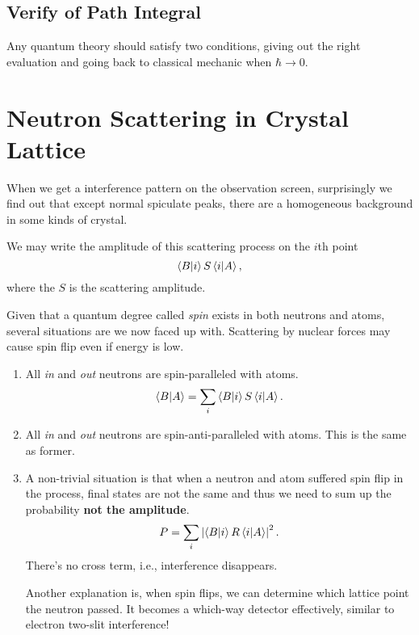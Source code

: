 \subsection[路径积分的检验]{Verify of Path Integral}
Any quantum theory should satisfy two conditions, giving out the right evaluation and going back to classical mechanic when $\hbar \to 0$.

\section[中子的晶格散射]{Neutron Scattering in Crystal Lattice}
When we get a interference pattern on the observation screen, surprisingly we find out that except normal spiculate peaks, there are a homogeneous background in some kinds of crystal.

We may write the amplitude of this scattering process on the $i$th point
\begin{equation}
  \bra{B}\ket{i}S\bra{i}\ket{A},
\end{equation}
where the $S$ is the scattering amplitude.

Given that a quantum degree called \textit{spin} exists in both neutrons and atoms, several situations are we now faced up with. Scattering by nuclear forces may cause spin flip even if energy is low. 

\begin{enumerate}
    \item All \textit{in} and \textit{out} neutrons are spin-paralleled with atoms.
    \begin{equation}
      \bra{B}\ket{A} = \sum_i \bra{B}\ket{i}S\bra{i}\ket{A}.
    \end{equation}
    
    \item All \textit{in} and \textit{out} neutrons are spin-anti-paralleled with atoms. This is the same as former.
    
    \item A non-trivial situation is that when a neutron and atom suffered spin flip in the process, final states are not the same and thus we need to sum up the probability \textbf{not the amplitude}.
    \begin{equation}
      P = \sum_{i} \left| \bra{B}\ket{i} R \bra{i} \ket{A} \right| ^2.
    \end{equation}
    There's no cross term, i.e., interference disappears.

    Another explanation is, when spin flips, we can determine which lattice point the neutron passed. It becomes a which-way detector effectively, similar to electron two-slit interference!
\end{enumerate}


